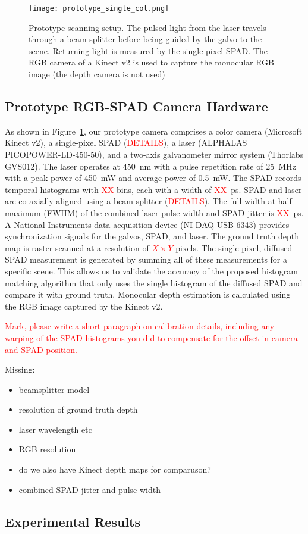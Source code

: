 \begin{figure}[H]
  \texttt{[image: prototype\_single\_col.png]}
  \caption{Prototype scanning setup. The pulsed light from the laser travels
    through a beam splitter before being guided by the galvo to the scene.
    Returning light is measured by the single-pixel SPAD. The RGB camera of a
    Kinect v2 is used to capture the monocular RGB image (the depth camera is
    not used)}
  \label{fig:prototype}
\end{figure}

\subsection{Prototype RGB-SPAD Camera Hardware}

As shown in Figure~\ref{fig:prototype}, our prototype camera comprises a color camera (Microsoft Kinect v2), a single-pixel SPAD (\textcolor{red}{DETAILS}), a laser (ALPHALAS PICOPOWER-LD-450-50), and a two-axis galvanometer mirror system (Thorlabs GVS012). The laser operates at 450~nm with a pulse repetition rate of 25~MHz with a peak power of 450~mW and average power of 0.5~mW. The SPAD records temporal histograms with \textcolor{red}{XX} bins, each with a width of \textcolor{red}{XX}~ps. SPAD and laser are co-axially aligned using a beam splitter (\textcolor{red}{DETAILS}). The full width at half maximum (FWHM) of the combined laser pulse width and SPAD jitter is \textcolor{red}{XX}~ps. A National Instruments data acquisition device (NI-DAQ USB-6343) provides synchronization signals for the galvos, SPAD, and laser. The ground truth depth map is raster-scanned at a resolution of \textcolor{red}{$X \times Y$} pixels. The single-pixel, diffused SPAD measurement is generated by summing all of these measurements for a specific scene. This allows us to validate the accuracy of the proposed histogram matching algorithm that only uses the single histogram of the diffused SPAD and compare it with ground truth. Monocular depth estimation is calculated using the RGB image captured by the Kinect v2.

\textcolor{red}{Mark, please write a short paragraph on calibration details, including any warping of the SPAD histograms you did to compensate for the offset in camera and SPAD position.}

Missing:
%
\begin{itemize}
\item beamsplitter model
\item resolution of ground truth depth
\item laser wavelength etc
\item RGB resolution
\item do we also have Kinect depth maps for comparuson?
\item combined SPAD jitter and pulse width
\end{itemize}

\subsection{Experimental Results}
